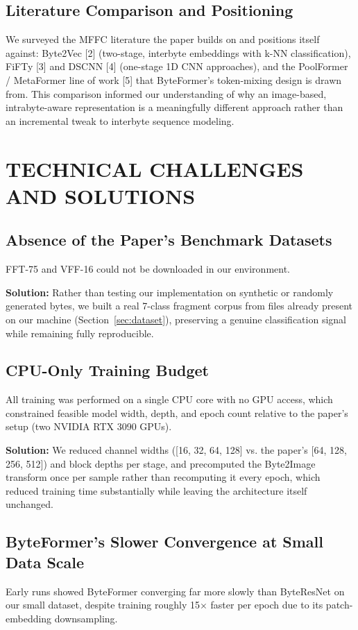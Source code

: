 \documentclass[conference]{IEEEtran}
\begin{document}
{\subsection{Literature Comparison and Positioning}
We surveyed the MFFC literature the paper builds on and positions itself against: Byte2Vec [2] (two-stage, interbyte embeddings with k-NN classification), FiFTy [3] and DSCNN [4] (one-stage 1D CNN approaches), and the PoolFormer / MetaFormer line of work [5] that ByteFormer's token-mixing design is drawn from. This comparison informed our understanding of why an image-based, intrabyte-aware representation is a meaningfully different approach rather than an incremental tweak to interbyte sequence modeling.

\section{TECHNICAL CHALLENGES AND SOLUTIONS}

\subsection{Absence of the Paper's Benchmark Datasets}
FFT-75 and VFF-16 could not be downloaded in our environment.

\textbf{Solution:} Rather than testing our implementation on synthetic or randomly generated bytes, we built a real 7-class fragment corpus from files already present on our machine (Section~\ref{sec:dataset}), preserving a genuine classification signal while remaining fully reproducible.

\subsection{CPU-Only Training Budget}
All training was performed on a single CPU core with no GPU access, which constrained feasible model width, depth, and epoch count relative to the paper's setup (two NVIDIA RTX 3090 GPUs).

\textbf{Solution:} We reduced channel widths ([16, 32, 64, 128] vs. the paper's [64, 128, 256, 512]) and block depths per stage, and precomputed the Byte2Image transform once per sample rather than recomputing it every epoch, which reduced training time substantially while leaving the architecture itself unchanged.

\subsection{ByteFormer's Slower Convergence at Small Data Scale}
Early runs showed ByteFormer converging far more slowly than ByteResNet on our small dataset, despite training roughly 15$\times$ faster per epoch due to its patch-embedding downsampling.

}
\end{document}
